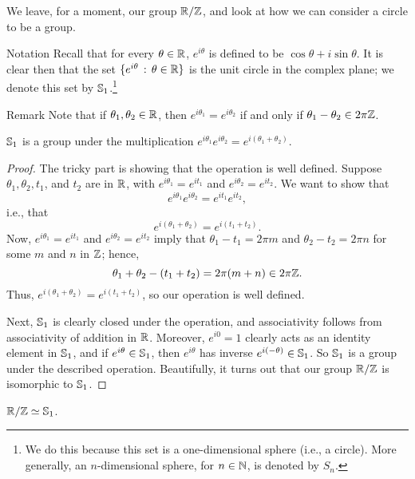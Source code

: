 We leave, for a moment, our group $\fatr/\Z$, and look at how we can
consider a circle to be a group.

\begin{df}{Notation} Recall that for every $\theta \in \fatr$,
$e^{i\theta}$ is defined to be $\cos \theta + i\sin \theta$. It
is clear then that the set $\{e^{i\theta} \,:\, \theta\in
\fatr\}$ is the unit circle in the complex plane; we denote
this set by $\S_1$.\footnote{We do this because this set is a
one-dimensional sphere (i.e., a circle).  More generally, an
$n$-dimensional sphere, for $n\in \fatn$, is denoted by $S_n$.}\end{df}

\begin{df}{Remark} Note that if $\theta_1, \theta_2\in \fatr$, then
$e^{i\theta_1}=e^{i\theta_2}$ if and only if $\theta_1-\theta_2
\in 2\pi \Z$.\end{df}


\begin{thm}\label{} $\S_1$ is a group under the multiplication
$e^{i\theta_1}e^{i\theta_2}=e^{i(\theta_1+\theta_2)}$.
\end{thm}

\begin{proof}  The tricky part is showing that the operation is well
defined. Suppose $\theta_1, \theta_2, t_1$, and $t_2$ are in
$\fatr$, with $e^{i\theta_1}=e^{it_1}$ and
$e^{i\theta_2}=e^{it_2}$. We want to show that
$$e^{i\theta_1}e^{i\theta_2}=e^{it_1}e^{it_2},$$ i.e., that
$$e^{i(\theta_1+\theta_2)}=e^{i(t_1+t_2)}.$$ Now, $e^{i\theta_1}=e^{it_1}$ and
$e^{i\theta_2}=e^{it_2}$ imply that $\theta_1 -t_1 = 2\pi m$
and $\theta_2-t_2 = 2\pi n$ for some $m$ and $n$ in $\Z$;
hence,
$$\theta_1+\theta_2-(t_1+t_2)= 2\pi(m+n) \in 2\pi\Z.$$  Thus,
$e^{i(\theta_1+\theta_2)}=e^{i(t_1+t_2)}$, so our operation is
well defined.

Next, $\S_1$ is clearly closed under the operation, and
associativity follows from associativity of addition in
$\fatr$. Moreover, $e^{i0}=1$ clearly acts as an identity
element in $\S_1$, and if $e^{i\theta}\in \S_1$, then
$e^{i\theta}$ has inverse $e^{i(-\theta)} \in \S_1$. So $\S_1$
is a group under the described operation.
 Beautifully, it turns out that our group $\fatr/\Z$ is
isomorphic to $\S_1$.\end{proof}

\begin{thm}\label{} $\fatr/\Z \simeq \S_1$.
\end{thm}

